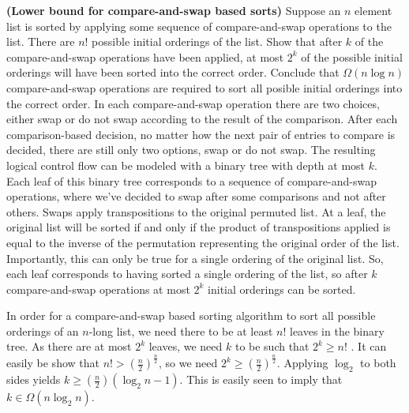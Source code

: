 
 \textbf{(Lower bound for compare-and-swap based sorts)} Suppose an $n$ element list is sorted by applying some sequence of compare-and-swap operations to the list.  There are $n!$ possible initial orderings of the list.  Show that after $k$ of the compare-and-swap operations have been applied, at most $2^k$ of the possible initial orderings will have been sorted into the correct order.  Conclude that $\Omega(n\log n)$ compare-and-swap operations are required to sort all posible initial orderings into the correct order.
\Soln In each compare-and-swap operation there are two choices, either swap or do not swap according to the result of the comparison.  After each comparison-based decision, no matter how the next pair of entries to compare is decided, there are still only two options, swap or do not swap.  The resulting logical control flow can be modeled with a binary tree with depth at most $k$.  Each leaf of this binary tree corresponds to a sequence of compare-and-swap operations, where we've decided to swap after some comparisons and not after others.  Swaps apply transpositions to the original permuted list.  At a leaf, the original list will be sorted if and only if the product of transpositions applied is equal to the inverse of the permutation representing the original order of the list.  Importantly, this can only be true for a single ordering of the original list. So, each leaf corresponds to having sorted a single ordering of the list, so after $k$ compare-and-swap operations at most $2^k$ initial orderings can be sorted.

In order for a compare-and-swap based sorting algorithm to sort all possible orderings of an $n$-long list, we need there to be at least $n!$ leaves in the binary tree.  As there are at most $2^k$ leaves, we need $k$ to be such that $2^k \geq n!$ .  It can easily be show that $n! > \left(\frac{n}{2}\right)^\frac{n}{2}$, so we need $2^k \geq  \left(\frac{n}{2}\right)^\frac{n}{2}$.  Applying $\log_2$ to both sides yields $k \geq \left(\frac{n}{2}\right)(\log_2 n-1)$.  This is easily seen to imply that $k\in\Omega(n\log_2 n)$.



 
















